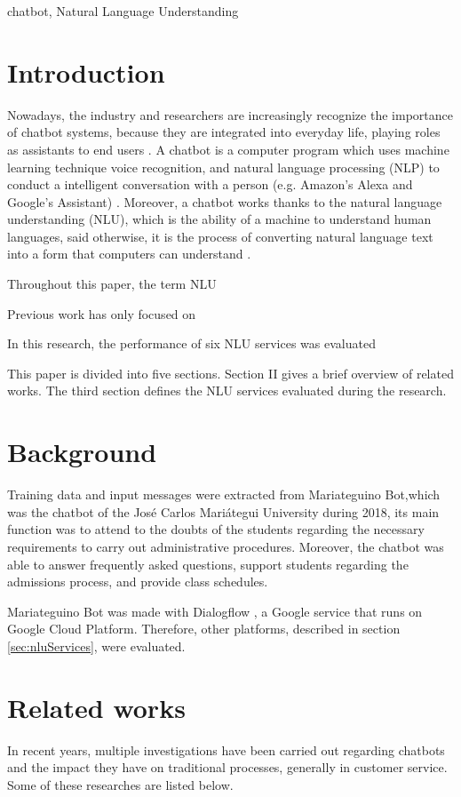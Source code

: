\documentclass[conference]{IEEEtran}
\begin{document}
\begin{IEEEkeywords}
    chatbot, Natural Language Understanding
\end{IEEEkeywords}

\section{Introduction}
Nowadays, the industry and researchers are increasingly recognize the importance of chatbot systems, because they are integrated into everyday life, playing roles as assistants to end users \cite{Bird2018}. A chatbot is a computer program which uses machine learning technique voice recognition, and natural language processing (NLP) to conduct a intelligent conversation with a person (e.g. Amazon's Alexa and Google's Assistant) \cite{mittal2019getting}. Moreover, a chatbot works thanks to the natural language understanding (NLU), which is the ability of a machine to understand human languages, said otherwise, it is the process of converting natural language text into a form that computers can understand \cite{pathak2017artificial}.



Throughout this paper, the term NLU

Previous work has only focused on

In this research, the performance of six NLU services was evaluated

This paper is divided into five sections. Section II gives a brief overview of related works. The third section defines the NLU services evaluated during the research.

\section{Background}
Training data and input messages were extracted from Mariateguino Bot,which was the chatbot of the José Carlos Mariátegui University during 2018, its main function was to attend to the doubts of the students regarding the necessary requirements to carry out administrative procedures. Moreover, the chatbot was able to answer frequently asked questions, support students regarding the admissions process, and provide class schedules.

Mariateguino Bot was made with Dialogflow \cite{dialogflow2020}, a Google service that runs on Google Cloud Platform. Therefore, other platforms, described in section \ref{sec:nluServices}, were evaluated.

\section{Related works}
In recent years, multiple investigations have been carried out regarding chatbots and the impact they have on traditional processes, generally in customer service. Some of these researches are listed below.
\end{document}
